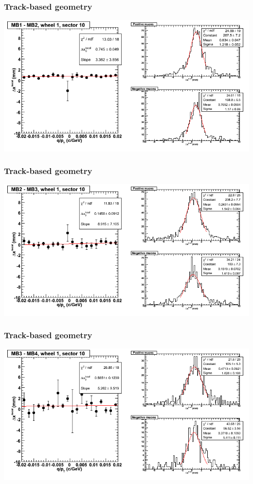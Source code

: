 \documentclass[compress]{beamer}
\begin{document}
\begin{frame}
\frametitle{Track-based geometry}
\includegraphics[width=\linewidth]{NOV4_segdiffs/dt13_resid_D_10_12.png}
\end{frame}

\begin{frame}
\frametitle{Track-based geometry}
\includegraphics[width=\linewidth]{NOV4_segdiffs/dt13_resid_D_10_23.png}
\end{frame}

\begin{frame}
\frametitle{Track-based geometry}
\includegraphics[width=\linewidth]{NOV4_segdiffs/dt13_resid_D_10_34.png}
\end{frame}
\end{document}
